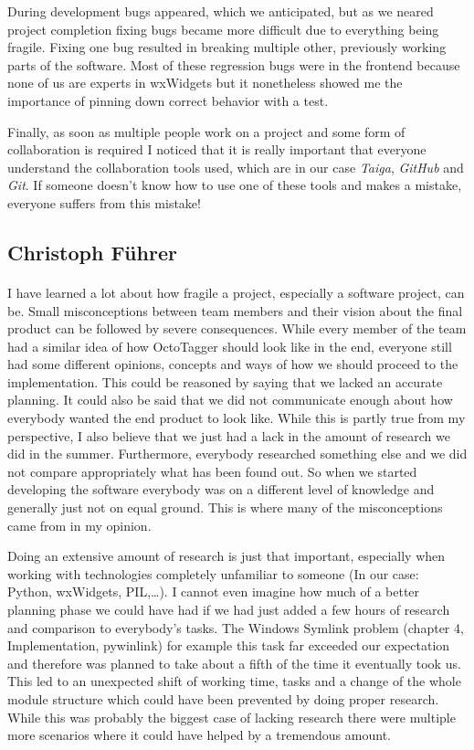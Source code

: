 During development bugs appeared, which we anticipated, but as we neared
project completion fixing bugs became more difficult due to everything being
fragile. Fixing one bug resulted in breaking multiple other, previously working
parts of the software. Most of these regression bugs were in the frontend
because none of us are experts in wxWidgets but it nonetheless showed me the
importance of pinning down correct behavior with a test.

Finally, as soon as multiple people work on a project and some form of
collaboration is required I noticed that it is really important that everyone
understand the collaboration tools used, which are in our case \emph{Taiga},
\emph{GitHub} and \emph{Git}. If someone doesn't know how to use one of
these tools and makes a mistake, everyone suffers from this mistake!

\subsection{Christoph Führer}

\paragraph{}
I have learned a lot about how fragile a project, especially a software project,
can be. Small misconceptions between team members and their vision about the
final product can be followed by severe consequences. While every member of the
team had a similar idea of how OctoTagger should look like in the end, everyone
still had some different opinions, concepts and ways of how we should proceed to
the implementation. This could be reasoned by saying that we lacked an accurate
planning. It could also be said that we did not communicate enough about how
everybody wanted the end product to look like. While this is partly true from my
perspective, I also believe that we just had a lack in the amount of research we
did in the summer. Furthermore, everybody researched something else and we did
not compare appropriately what has been found out. So when we started developing
the software everybody was on a different level of knowledge and generally just
not on equal ground. This is where many of the misconceptions came from in my
opinion.  

Doing an extensive amount of research is just that important, especially when
working with technologies completely unfamiliar to someone (In our case: Python,
wxWidgets, PIL,\ldots). I cannot even imagine how much of a better planning
phase we could have had if we had just added a few hours of research and
comparison to everybody's tasks. The Windows Symlink problem (chapter 4,
Implementation, pywinlink) for example this task far exceeded our expectation
and therefore was planned to take about a fifth of the time it eventually took
us. This led to an unexpected shift of working time, tasks and a change of the
whole module structure which could have been prevented by doing proper research.
While this was probably the biggest case of lacking research there were multiple
more scenarios where it could have helped by a tremendous amount.

